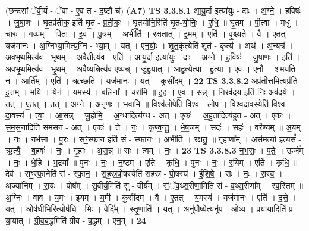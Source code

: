 \documentclass[17pt]{extarticle}
\begin{document}
                  \newline
                      (छन्द॑सां ॅवी॒र्यं॑ - ॅवा - ए॒व त - द॒ष्टौ च॑)  \textbf{(A7)} \newline \newline
                                \textbf{ TS 3.3.8.1} \newline
                  आ॒यु॒र्दा इत्या॑युः - दाः । अ॒ग्ने॒ । ह॒विषः॑ । जु॒षा॒णः । घृ॒तप्र॑तीक॒ इति॑ घृ॒त - प्र॒ती॒कः॒ । घृ॒तयो॑नि॒रिति॑ घृ॒त-यो॒निः॒ । ए॒धि॒ ॥ घृ॒तम् । पी॒त्वा । मधु॑ । चारु॑ । गव्य᳚म् । पि॒ता । इ॒व॒ । पु॒त्रम् । अ॒भीति॑ । र॒क्ष॒ता॒त् । इ॒मम् ॥ एति॑ । वृ॒श्च्य॒ते॒ । वै । ए॒तत् । यज॑मानः । अ॒ग्निभ्या॒मित्य॒ग्नि - भ्या॒म् । यत् । ए॒न॒योः॒ । शृ॒त॒कृंत्येति॑ शृतं - कृत्य॑ । अथ॑ । अ॒न्यत्र॑ । अ॒व॒भृ॒थमित्य॑व - भृ॒थम् । अ॒वैतीत्य॑व - एति॑ । आ॒यु॒र्दा इत्या॑युः - दाः । अ॒ग्ने॒ । ह॒विषः॑ । जु॒षा॒णः । इति॑ । अ॒व॒भृ॒थमित्य॑व - भृ॒थम् । अ॒वै॒ष्यन्नित्य॑व-ए॒ष्यन्न् । जु॒हु॒या॒त् । आहु॒त्येत्या - हु॒त्या॒ । ए॒व । ए॒नौ॒ । श॒म॒य॒ति॒ । न । आर्ति᳚म् । एति॑ । ऋ॒च्छ॒ति॒ । यज॑मानः । यत् । कुसी॑दम् । \textbf{  22} \newline
                  \newline
                                \textbf{ TS 3.3.8.2} \newline
                  अप्र॑तीत्त॒मित्यप्र॑ति-इ॒त्त॒म् । मयि॑ । येन॑ । य॒मस्य॑ । ब॒लिना᳚ । चरा॑मि ॥ इ॒ह । ए॒व । सन्न् । नि॒रव॑दय॒ इति॑ निः-अव॑दये । तत् । ए॒तत् । तत् । अ॒ग्ने॒ । अ॒नृ॒णः । भ॒वा॒मि॒ ॥ विश्व॑लो॒पेति॒ विश्व॑ - लो॒प॒ । वि॒श्व॒दा॒वस्येति॑ विश्व - दा॒वस्य॑ । त्वा॒ । आ॒सन्न् । जु॒हो॒मि॒ । अ॒ग्धादित्य॑ग्ध - अत् । एकः॑ । अ॒हु॒तादित्य॑हुत - अत् । एकः॑ । स॒म॒स॒नादिति॑ समसन - अत् । एकः॑ ॥ ते । नः॒ । कृ॒ण्व॒न्तु॒ । भे॒ष॒जम् । सदः॑ । सहः॑ । वरे᳚ण्यम् ॥ अ॒यम् । नः॒ । नभ॑सा । पु॒रः । सꣳ॒॒स्फान॒ इति॑ सं - स्फानः॑ । अ॒भीति॑ । र॒क्ष॒तु॒ ॥ गृ॒हाणा᳚म् । अस॑मर्त्या॒ इत्यसं᳚ - ऋ॒त्यै॒ । ब॒हवः॑ । नः॒ । गृ॒हाः । अ॒स॒न्न् ॥ सः । त्वम् । नः॒ । \textbf{  23} \newline
                  \newline
                                \textbf{ TS 3.3.8.3} \newline
                  न॒भ॒सः॒ । प॒ते॒ । ऊर्ज᳚म् । नः॒ । धे॒हि॒ । भ॒द्रया᳚ ॥ पुनः॑ । नः॒ । न॒ष्टम् । एति॑ । कृ॒धि॒ । पुनः॑ । नः॒ । र॒यिम् । एति॑ । कृ॒धि॒ ॥ देव॑ । सꣳ॒॒स्फा॒नेति॑ सं - स्फा॒न॒ । स॒ह॒स्र॒पो॒षस्येति॑ सहस्र - पो॒षस्य॑ । ई॒शि॒षे॒ । सः । नः॒ । रा॒स्व॒ । अज्या॑निम् । रा॒यः । पोष᳚म् । सु॒वीर्य॒मिति॑ सु - वीर्य᳚म् । सं॒ॅव॒थ्स॒रीणा॒मिति॑ सं - व॒थ्स॒रीणा᳚म् । स्व॒स्तिम् ॥ अ॒ग्निः । वाव । य॒मः । इ॒यम् । य॒मी । कुसी॑दम् । वै । ए॒तत् । य॒मस्य॑ । यज॑मानः । एति॑ । द॒त्ते॒ । यत् । ओष॑धीभि॒रित्योष॑धि - भिः॒ । वेदि᳚म् । स्तृ॒णाति॑ । यत् । अनु॑पौ॒ष्येत्यनु॑प - ओ॒ष्य॒ । प्र॒या॒यादिति॑ प्र - या॒यात् । ग्री॒व॒ब॒द्धमिति॑ ग्रीव - ब॒द्धम् । ए॒न॒म् । \textbf{  24} \newline
\end{document}
